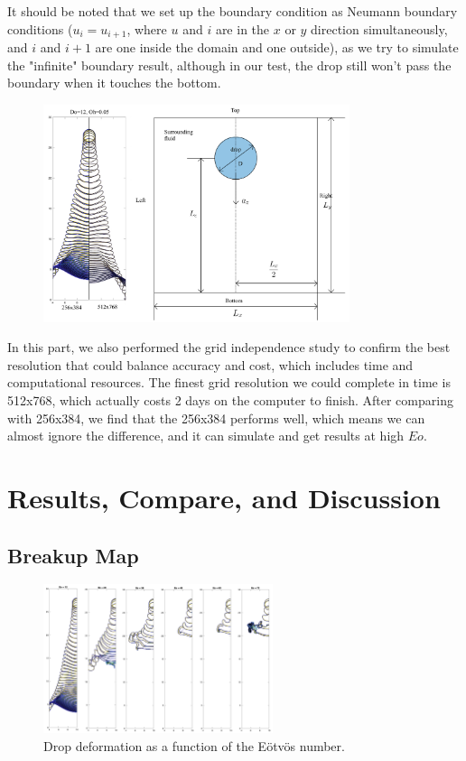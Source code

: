 \documentclass[12pt]{article}
\begin{document}
It should be noted that we set up the boundary condition as Neumann boundary conditions ($u_i = u_{i+1}$, where $u$ and $i$ are in the $x$ or $y$ direction simultaneously, and $i$ and $i+1$ are one inside the domain and one outside), as we try to simulate the "infinite" boundary result, although in our test, the drop still won't pass the boundary when it touches the bottom.

\begin{figure}[H]
    \centering
    \includegraphics[width=0.8\textwidth]{Latex/figures/Domain_grid_indep.jpg}
    \label{deformation}
\end{figure}

In this part, we also performed the grid independence study to confirm the best resolution that could balance accuracy and cost, which includes time and computational resources. The finest grid resolution we could complete in time is 512x768, which actually costs 2 days on the computer to finish. After comparing with 256x384, we find that the 256x384 performs well, which means we can almost ignore the difference, and it can simulate and get results at high $Eo$.

\section{Results, Compare, and Discussion}

\subsection{Breakup Map}

\begin{figure}[H]
    \centering
    \includegraphics[width=0.6\textwidth]{figures/Eo_effect.jpg}
    \caption{Drop deformation as a function of the Eötvös number.}
    \label{fig:deformation}
\end{figure}
\end{document}

